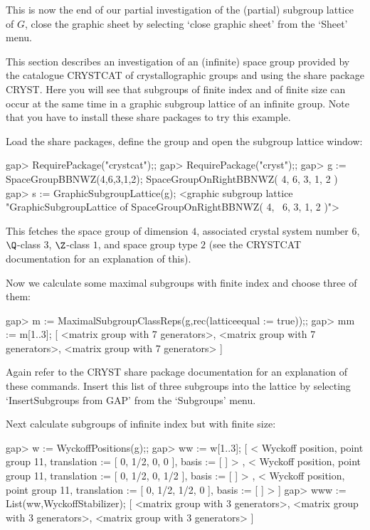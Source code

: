 This  is now  the end of   our partial investigation  of the (partial)
subgroup lattice  of $G$, close  the graphic sheet by selecting `close
graphic sheet' from the `Sheet' menu.



This section describes an investigation of an (infinite) space group
provided by the catalogue CRYSTCAT of crystallographic groups and
using the share package CRYST. Here you will see that subgroups of
finite index and of finite size can occur at the same time in a
graphic subgroup lattice of an infinite group. Note that you have to
install these share packages to try this example.

Load the share packages, define the group and open the subgroup
lattice window: 

\begintt
gap> RequirePackage("crystcat");;
gap> RequirePackage("cryst");;
gap> g := SpaceGroupBBNWZ(4,6,3,1,2);
SpaceGroupOnRightBBNWZ( 4, 6, 3, 1, 2 )
gap> s := GraphicSubgroupLattice(g);
<graphic subgroup lattice "GraphicSubgroupLattice of SpaceGroupOnRightBBNWZ( 4, \
6, 3, 1, 2 )">
\endtt

This fetches the space group of dimension $4$, associated crystal
system number $6$, $\Q$-class 3, $\Z$-class $1$, and space group type
$2$ (see the CRYSTCAT documentation for an explanation of this).

Now we calculate some maximal subgroups with finite index and choose three of
them:

\begintt
gap> m := MaximalSubgroupClassReps(g,rec(latticeequal := true));;
gap> mm := m{[1..3]};
[ <matrix group with 7 generators>, <matrix group with 7 generators>, 
  <matrix group with 7 generators> ]
\endtt

Again refer to the CRYST share package documentation for an
explanation of these commands. Insert this list of three subgroups
into the lattice by selecting `InsertSubgroups from GAP' from the
`Subgroups' menu.

Next calculate subgroups of infinite index but with finite size:

\begintt
gap> w := WyckoffPositions(g);;
gap> ww := w{[1..3]};
[ < Wyckoff position, point group 11, translation := [ 0, 1/2, 0, 0 ], 
    basis := [  ] >
    , < Wyckoff position, point group 11, translation := [ 0, 1/2, 0, 1/2 ], 
    basis := [  ] >
    , < Wyckoff position, point group 11, translation := [ 0, 1/2, 1/2, 0 ], 
    basis := [  ] >
     ]
gap> www := List(ww,WyckoffStabilizer);
[ <matrix group with 3 generators>, <matrix group with 3 generators>, 
  <matrix group with 3 generators> ]
\endtt


